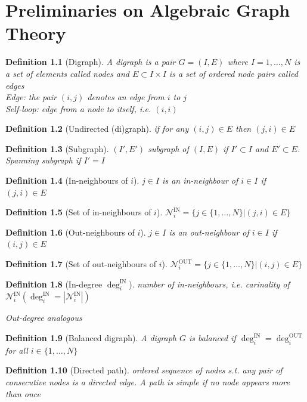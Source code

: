 \documentclass{book}
\theoremstyle{theoremv2}
\theoremstyle{defv2}
\newtheorem{definition}{Definition}[chapter]
\theoremstyle{remark}
\theoremstyle{remark}
\theoremstyle{definition}
\theoremstyle{definition}
\begin{document}
\chapter{Preliminaries on Algebraic Graph Theory}
\begin{definition}[Digraph]
    A digraph is a pair $G=(I,E)$ where $I={1,\dots,N}$ is a set of elements called \emph{nodes} and $E\subset I \times I$ is a set of ordered node pairs called \emph{edges}\\
    \emph{Edge}: the pair $(i,j)$ denotes an edge from $i$ to $j$\\ 
    \emph{Self-loop}: edge from a node to itself, i.e. $(i,i)$
\end{definition}
\begin{definition}[Undirected (di)graph]
    if for any $(i,j)\in E$ then $(j,i)\in E$  
\end{definition}
\begin{definition}[Subgraph]
    $(I',E')$ subgraph of $(I,E)$ if $I'\subset I$ and $E' \subset E$. Spanning subgraph if $I'=I$
\end{definition}
\begin{definition}[In-neighbours of $i$]$j\in I$ is an in-neighbour of $i\in I$ if $(j,i)\in E$
\end{definition}
\begin{definition}[Set of in-neighbours of $i$]
    $\mathcal{N}_i^{\text{IN}}=\{j\in\{1,\dots,N\}|(j,i)\in E\}$
\end{definition}
\begin{definition}[Out-neighbours of $i$]$j\in I$ is an out-neighbour of $i\in I$ if $(i,j)\in E$
\end{definition}
\begin{definition}[Set of out-neighbours of $i$]
    $\mathcal{N}_i^{\text{OUT}}=\{j\in\{1,\dots,N\}|(i,j)\in E\}$
\end{definition}
\begin{definition}[In-degree $\deg_i^{\text{IN}}$]
    number of in-neighbours, i.e. carinality of $\mathcal{N}_i^{\text{IN}}(\deg_i^{\text{IN}}=|\mathcal{N}_i^{\text{IN}}|)$

    Out-degree analogous
\end{definition}
\begin{definition}[Balanced digraph]
    A digraph $G$ is balanced if $\deg_i^{\text{IN}}=\deg_i^{\text{OUT}}$ for all $i\in\{1,\dots,N\}$
\end{definition}
\begin{definition}[Directed path]
    ordered sequence of nodes s.t. any pair of consecutive nodes is a directed edge. A path is \emph{simple} if no node appears more than once
\end{definition}
\end{document}

